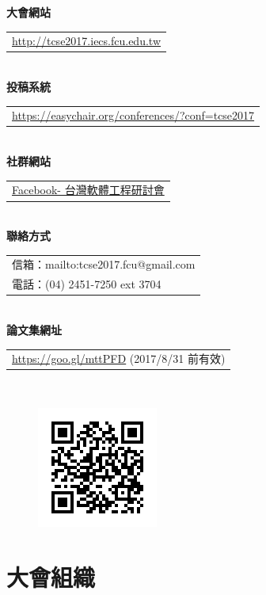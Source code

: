 \documentclass[12pt,oneside,a4paper]{book}
\begin{document}
\textbf{大會網站}
\begin{tabular}{l}
\href{http://tcse2017.iecs.fcu.edu.tw}{http://tcse2017.iecs.fcu.edu.tw}\\
\end{tabular}
\\

\textbf{投稿系統}
\begin{tabular}{l}
\href{https://easychair.org/conferences/?conf=tcse2017}{https://easychair.org/conferences/?conf=tcse2017}\\
\end{tabular}
\\

\textbf{社群網站}
\begin{tabular}{l}
\href{https://www.facebook.com/360848907645882/}{Facebook- 台灣軟體工程研討會} \\
\end{tabular}
\\

\textbf{聯絡方式}
\begin{tabular}{l}
信箱：mailto:tcse2017.fcu@gmail.com\\
電話：(04) 2451-7250 ext 3704\\
\end{tabular}
\\

\textbf{論文集網址}
\begin{tabular}{l}
\href{https://goo.gl/mttPFD}{https://goo.gl/mttPFD} (2017/8/31 前有效) \\
\end{tabular}
\\

\begin{figure}[h!]
\includegraphics[]{images/qr_code.png}
\end{figure}



\chapter*{大會組織}
%
\end{document}
